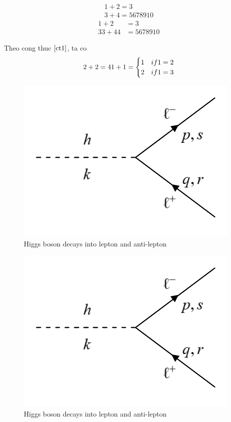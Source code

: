 \documentclass[a4paper, 11pt]{article}
\begin{document}
	\tableofcontents
	\begin{align}
	1+2=3\\
	3+4=5678910
	\end{align}
	\begin{align}
	1+2&=3\\
	33+44&=5678910 \label{ct1}
	\end{align}

	Theo cong thuc $ \eqref{ct1} $, ta co
	\begin{equation}
	2+2=4\\
	1+1=
	\begin{cases}
	1 &if 1=2\\
	2 &if 1=3
	\end{cases}
	\end{equation}
	\begin{figure}[h!]
	\centering
	\includegraphics[width = 0.3\linewidth]{hll.png}
	\caption{Higgs boson decays into lepton and anti-lepton}
	\label{hinh1}
	\end{figure}
	\begin{figure}[h!]
		\centering
			\includegraphics[width = 0.3\linewidth]{hll.png}
			\caption{Higgs boson decays into lepton and anti-lepton}
			\label{hinh2}
	\end{figure}
\end{document}
